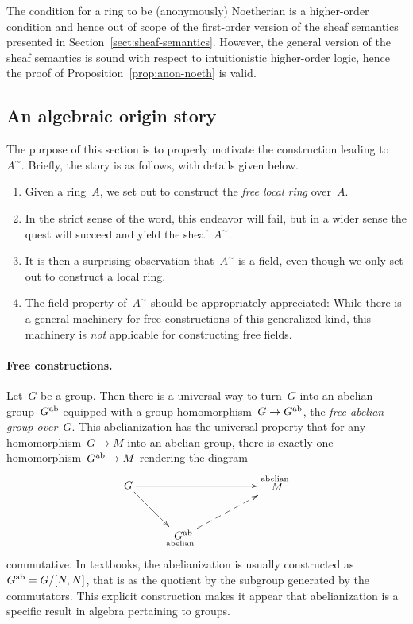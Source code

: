 \documentclass{ws-rv9x6}
\begin{document}
{\begin{remark}The condition for a ring to be (anonymously) Noetherian is a
higher-order condition and hence out of scope of the first-order version of the
sheaf semantics presented in Section~\ref{sect:sheaf-semantics}. However, the
general version of the sheaf semantics is sound with respect to intuitionistic
higher-order logic, hence the proof of Proposition~\ref{prop:anon-noeth} is
valid.
\end{remark}


\subsection{An algebraic origin story}
\label{sect:origins}

The purpose of this section is to properly motivate the construction
leading to~$A^\sim$. Briefly, the story is as follows, with details given
below.
\begin{enumerate}
\item Given a ring~$A$, we set out to construct the \emph{free local ring}
over~$A$.
\item In the strict sense of the word, this endeavor will fail, but in a wider
sense the quest will succeed and yield the sheaf~$A^\sim$.
\item It is then a surprising observation that~$A^\sim$ is a field, even though
we only set out to construct a local ring.
\item The field property of~$A^\sim$ should be appropriately appreciated: While
there is a general machinery for free constructions of this generalized kind, this
machinery is \emph{not} applicable for constructing free fields.
\end{enumerate}

\paragraph{Free constructions.}
Let~$G$ be a group. Then there is a universal way to turn~$G$ into an abelian
group~$G^{\mathrm{ab}}$ equipped with a group homomorphism~$G \to G^{\mathrm{ab}}$, the \emph{free
abelian group over~$G$}. This abelianization has the universal property that
for any homomorphism~$G \to M$ into an abelian group, there is exactly one
homomorphism~$G^{\mathrm{ab}} \to M$ rendering the diagram
\[ \xymatrix{
  G \ar[rd] \ar[rrr] &&& {\substack{\text{abelian}\\\text{\normalsize$\!M$}\\\phantom{\text{abelian}}}} \\
  & {\substack{\text{\normalsize$G^\ab$}\\\text{abelian}}} \ar@{-->}_[@!29]{}[rru]
} \]
commutative. In textbooks, the abelianization is usually constructed as~$G^{\mathrm{ab}}
= G/[N,N]$, that is as the quotient by the subgroup generated by the
commutators. This explicit construction makes it appear that abelianization
is a specific result in algebra pertaining to groups.

}
\end{document}

